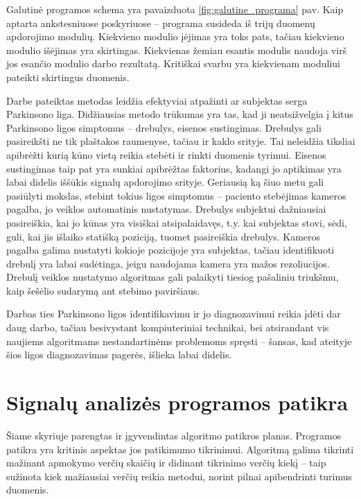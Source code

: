 \documentclass[]{vgtuef}
\begin{document}
Galutinė programos schema yra pavaizduota \ref{fig:galutine_programa} pav. Kaip aptarta ankstesniuose poskyriuose -- programa susideda iš trijų duomenų apdorojimo modulių. Kiekvieno modulio įėjimas yra toks pats, tačiau kiekvieno modulio išėjimas yra skirtingas. Kiekvienas žemiau esantis modulis naudoja virš jos esančio modulio darbo rezultatą. Kritiškai svarbu yra kiekvienam moduliui pateikti skirtingus duomenis.

Darbe pateiktas metodas leidžia efektyviai atpažinti ar subjektas serga Parkinsono liga. Didžiausias metodo trūkumas yra tas, kad ji neatsižvelgia į kitus Parkinsono ligos simptomus -- drebulys, eisenos sustingimas. Drebulys gali pasireikšti ne tik plaštakos raumenyse, tačiau ir kaklo srityje. Tai neleidžia tiksliai apibrėžti kurią kūno vietą reikia stebėti ir rinkti duomenis tyrimui. Eisenos sustingimas taip pat yra sunkiai apibrėžtas faktorius, kadangi jo aptikimas yra labai didelis iššūkis signalų apdorojimo srityje. Geriausią ką šiuo metu gali pasiūlyti mokslas, stebint tokius ligos simptomus -- paciento stebėjimas kameros pagalba, jo veiklos automatinis nustatymas. Drebulys subjektui dažniausiai pasireiškia, kai jo kūnas yra visiškai atsipalaidavęs, t.y. kai subjektas stovi, sėdi, guli, kai jis išlaiko statišką poziciją, tuomet pasireiškia drebulys. Kameros pagalba galima nustatyti kokioje pozicijoje yra subjektas, tačiau identifikuoti drebulį yra labai sudėtinga, jeigu naudojama kamera yra mažos rezoliucijos. Drebulį veiklos nustatymo algoritmas gali palaikyti tiesiog pašaliniu triukšmu, kaip šešėlio sudarymą ant stebimo paviršiaus. 

Darbas ties Parkinsono ligos identifikavimu ir jo diagnozavimui reikia įdėti dar daug darbo, tačiau besivystant kompiuteriniai technikai, bei atsirandant vis naujiems algoritmams nestandartinėms problemoms spręsti -- šansas, kad ateityje šios ligos diagnozavimas pagerės, išlieka labai didelis.

\section{Signalų analizės programos patikra}

Šiame skyriuje parengtas ir įgyvendintas algoritmo patikros planas. Programos patikra yra kritinis aspektas jos patikimumo tikrinimui. Algoritmą galima tikrinti mažinant apmokymo verčių skaičių ir didinant tikrinimo verčių kiekį -- taip sužinota kiek mažiausiai verčių reikia metodui, norint pilnai apibendrinti turimus duomenis.
\end{document}
